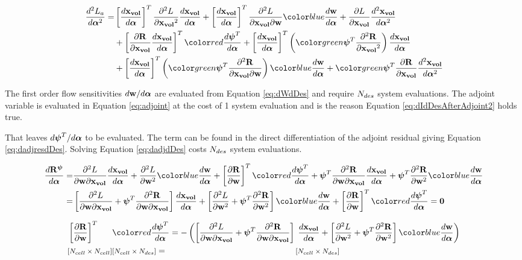 \documentclass[letterpaper,12pt,]{article}
\begin{document}
\begin{equation}
\begin{split}
	\DDt{L_a}{\balfa} = 
	&
	\trans{\Dt{\xvol}{\balfa}}
	\ddel{L}{\xvol}
	\Dt{\xvol}{\balfa}
	+
	\trans{\Dt{\xvol}{\balfa}}
	\ddelm{L}{\xvol}{\bw}
	\blue{\Dt{\bw}{\balfa}}
	+
	\del{L}{\xvol}
	\DDt{\xvol}{\balfa}
	\\
	&+
	\trans{
	\del{\bR}{\xvol}
	\Dt{\xvol}{\balfa}
	}
	\red{\Dt{\bpsi^T}{\balfa}}
	+
	\trans{\Dt{\xvol}{\balfa}}
	\left(
	\green{\bpsi}^T
	\ddel{\bR}{\xvol}
	\right)
	\Dt{\xvol}{\balfa}
	\\
	&+
	\trans{\Dt{\xvol}{\balfa}}
	\left(
	\green{\bpsi}^T
	\ddelm{\bR}{\xvol}{\bw}
	\right)
	\blue{\Dt{\bw}{\balfa}}
	+
	\green{\bpsi}^T
	\del{\bR}{\xvol}
	\DDt{\xvol}{\balfa}
\label{eq:ADHessian}
\end{split}
\end{equation}

The first order flow sensitivities $d\mathbf{w}/d\boldsymbol{\alpha}$ are evaluated from Equation \ref{eq:dWdDes} and require $N_{des}$ system evaluations.
The adjoint variable is evaluated in Equation \ref{eq:adjoint} at the cost of 1 system evaluation and is the reason Equation \ref{eq:dIdDesAfterAdjoint2} holds true.

That leaves $d\boldsymbol{\psi}^T/d\boldsymbol{\alpha}$ to be evaluated.
The term can be found in the direct differentiation of the adjoint residual giving Equation \ref{eq:dadjresdDes}.
Solving Equation \ref{eq:dadjdDes} costs $N_{des}$ system evaluations.

\begin{equation}
\begin{split}
	\Dt{\bR^{\bpsi}}{\balfa}
	=&
	\ddelm{L}{\bw}{\xvol}
	\Dt{\xvol}{\balfa}
	+
	\ddel{L}{\bw}
	\blue{\Dt{\bw}{\balfa}}
	+
	\trans{\del{\bR}{\bw}}
	\red{\Dt{\bpsi^T}{\balfa}}
	+
	\bpsi^T
	\ddelm{\bR}{\bw}{\xvol}
	\Dt{\xvol}{\balfa}
	+
	\bpsi^T
	\ddel{\bR}{\bw}
	\blue{\Dt{\bw}{\balfa}}
	\\
	=&
	\left[
	\ddelm{L}{\bw}{\xvol}
	+
	\bpsi^T
	\ddelm{\bR}{\bw}{\xvol}
	\right]
	\Dt{\xvol}{\balfa}
	+
	\left[
		\ddel{L}{\bw}
		+
		\bpsi^T
		\ddel{\bR}{\bw}
	\right]
	\blue{\Dt{\bw}{\balfa}}
	+
	\trans{\del{\bR}{\bw}}
	\red{\Dt{\bpsi^T}{\balfa}} = \mbf{0}
\label{eq:dadjresdDes}
\end{split}
\end{equation}

\begin{equation}
\begin{alignedat}{4}
	&\trans{\del{\bR}{\bw}}
	&&\red{\Dt{\bpsi^T}{\balfa}}
	=
	-\left(
	\left[
	\ddelm{L}{\bw}{\xvol}
	+
	\bpsi^T
	\ddelm{\bR}{\bw}{\xvol}
	\right]
	\right.&&
	\left.
	\Dt{\xvol}{\balfa}
	+
	\left[
		\ddel{L}{\bw}
		+
		\bpsi^T
		\ddel{\bR}{\bw}
	\right]
	\blue{\Dt{\bw}{\balfa}}
	\right)
\\
	& \nxn{\ncell}{\ncell}
	&& \nxn{\ncell}{\ndes}
	=
	&& \nxn{\ncell}{\ndes}
\label{eq:dadjdDes}
\end{alignedat}
\end{equation}
\end{document}
